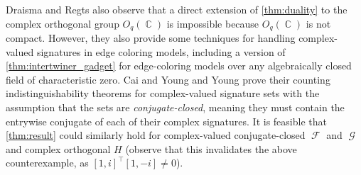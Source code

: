 \documentclass{article}
\theoremstyle{remark}
\theoremstyle{definition}
\DeclareMathOperator{\cc}{\mathbb{C}}
\DeclareMathOperator{\fc}{\mathcal{F}}
\DeclareMathOperator{\gc}{\mathcal{G}}
\begin{document}
Draisma and Regts also observe that a direct extension of \autoref{thm:duality} to the complex
orthogonal group $O_q(\cc)$ is impossible because $O_q(\cc)$ is not compact. However, they
also provide some techniques for handling complex-valued
signatures in edge coloring models, including a version \cite[Theorem 3]{draisma_tensor_2013} of \autoref{thm:intertwiner_gadget}
for edge-coloring models over any algebraically closed field of characteristic zero.
Cai and Young \cite{cai_planar_2023} and Young \cite{young2022equality} prove their counting
indistinguishability theorems for complex-valued signature sets with the assumption that the sets
are \emph{conjugate-closed}, meaning they must contain the entrywise conjugate of each of their
complex signatures.
It is feasible that \autoref{thm:result} could similarly hold for complex-valued conjugate-closed
$\fc$ and $\gc$ and complex orthogonal $H$ (observe that this invalidates the above counterexample,
as $[1,i]^\top [1,-i] \neq 0$).
\end{document}
